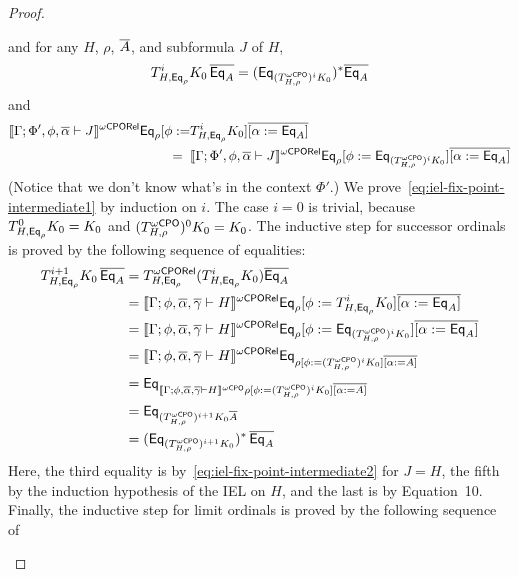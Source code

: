 \documentclass[acmsmall,review,anonymous]{acmart}
\theoremstyle{definition}
\begin{document}
\begin{proof}
\begin{itemize}
and for any $H$, $\rho$, $\overline{A}$, and subformula $J$ of $H$,
\begin{equation}\label{eq:iel-fix-point-intermediate1}
T^i_{H, \mathsf{Eq}_{\rho}} K_0\, \overline{\mathsf{Eq}_A} = (\mathsf{Eq}_{(T^{\omega\mathsf{CPO}}_{H, \rho})^i K_0})^*
\overline{\mathsf{Eq}_A}
\end{equation}
and 
\begin{equation}\label{eq:iel-fix-point-intermediate2}
\begin{split}
  \llbracket{\Gamma; \Phi', \phi, \overline{\alpha} \vdash J}\rrbracket^{{\omega\mathsf{CPORel}}}
\mathsf{Eq}_{\rho} [\phi := 
 & T^i_{H,\mathsf{Eq}_{\rho}} K_0] \overline{[\alpha :=
    \mathsf{Eq}_A]} \\
=\;\; & \llbracket{\Gamma; \Phi', \phi, \overline{\alpha} \vdash J}\rrbracket^{{\omega\mathsf{CPORel}}} \mathsf{Eq}_{\rho} [\phi
  := \mathsf{Eq}_{(T^{\omega\mathsf{CPO}}_{H,\rho})^i K_0}] \overline{[\alpha :=
    \mathsf{Eq}_A]}
\end{split}
\end{equation}
(Notice that we don't know what's in the context $\Phi'$.)  We
prove~\eqref{eq:iel-fix-point-intermediate1} by induction on $i$.  The
case $i=0$ is trivial, because $T^0_{H,\mathsf{Eq}_{\rho}} K_0 = K_0$ and
$(T^{\omega\mathsf{CPO}}_{H,\rho})^0 K_0 = K_0$. The inductive step for successor
ordinals is proved by the following sequence of equalities:
\[
\begin{split}
T^{i+1}_{H,\mathsf{Eq}_{\rho}} K_0\, \overline{\mathsf{Eq}_A}
&= T^{\omega\mathsf{CPORel}}_{H,\mathsf{Eq}_{\rho}} (T^i_{H,\mathsf{Eq}_{\rho}} K_0)
\overline{\mathsf{Eq}_A} \\ 
&= \llbracket{\Gamma; \phi, \overline{\alpha}, \overline{\gamma} \vdash H}\rrbracket^{{\omega\mathsf{CPORel}}} \mathsf{Eq}_{\rho} [\phi
  := T^i_{H, \mathsf{Eq}_{\rho}} K_0] \overline{[\alpha :=
    \mathsf{Eq}_A]} \\ 
&= \llbracket{\Gamma; \phi, \overline{\alpha}, \overline{\gamma} \vdash H}\rrbracket^{{\omega\mathsf{CPORel}}} \mathsf{Eq}_{\rho} [\phi
  := \mathsf{Eq}_{(T^{\omega\mathsf{CPO}}_{H,\rho})^i K_0}] \overline{[\alpha :=
    \mathsf{Eq}_A]} \\ 
&= \llbracket{\Gamma; \phi, \overline{\alpha}, \overline{\gamma} \vdash H}\rrbracket^{{\omega\mathsf{CPORel}}} \mathsf{Eq}_{\rho [\phi
    := (T^{\omega\mathsf{CPO}}_{H,\rho})^i K_0] \overline{[\alpha :=
      A]}} \\ 
&= \mathsf{Eq}_{\llbracket{\Gamma; \phi, \overline{\alpha}, \overline{\gamma} \vdash H}\rrbracket^{{\omega\mathsf{CPO}}} \rho [\phi
    := (T^{\omega\mathsf{CPO}}_{H,\rho})^i K_0] \overline{[\alpha :=
      A]}} \\ 
&= \mathsf{Eq}_{(T^{\omega\mathsf{CPO}}_{H,\rho})^{i+1} K_0 \overline{A}} \\ 
&= (\mathsf{Eq}_{(T^{\omega\mathsf{CPO}}_{H,\rho})^{i+1} K_0})^*\, \overline{\mathsf{Eq}_A} 
\end{split}
\]
Here, the third equality is by~\eqref{eq:iel-fix-point-intermediate2}
for $J = H$, the fifth by the induction hypothesis of the IEL on $H$,
and the last is by Equation~10. {\color{red} Finally, the inductive
  step for limit ordinals is proved by the following sequence of
}
\end{itemize}
\end{proof}
\end{document}
